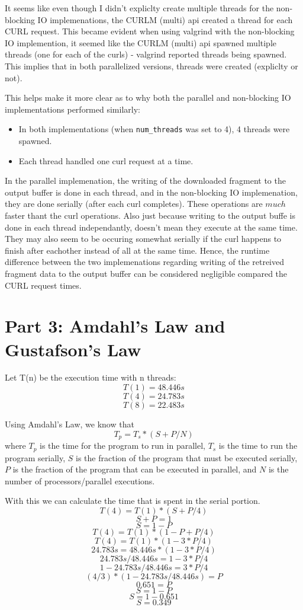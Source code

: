 \documentclass[12pt]{article}
\begin{document}
It seems like even though I didn't expliclty create multiple threads for the non-blocking IO implemenations, the CURLM (multi) api created a thread for each CURL request. This became evident when using valgrind with the non-blocking IO implemention, it seemed like the CURLM (multi) api spawned multiple threads (one for each of the curls) - valgrind reported threads being spawned. This implies that in both parallelized versions, threads were created (expliclty or not).

This helps make it more clear as to why both the parallel and non-blocking IO implementations performed similarly:
\begin{itemize}
\item In both implementations (when {\tt num\_threads} was set to 4), 4 threads were spawned.
\item Each thread handled one curl request at a time.
\end{itemize}

In the parallel implemenation, the writing of the downloaded fragment to the output buffer is done in each thread, and in the non-blocking IO implemenation, they are done serially (after each curl completes). These operations are $much$ faster thant the curl operations. Also just because writing to the output buffe is done in each thread independantly, doesn't mean they execute at the same time. They may also seem to be occuring somewhat serially if the curl happens to finish after eachother instead of all at the same time. Hence, the runtime difference between the two implemenations regarding writing of the retreived fragment data to the output buffer can be considered negligible compared the CURL request times.

\section*{Part 3: Amdahl's Law and Gustafson's Law}

Let T(n) be the execution time with n threads:
\[ T(1) = 48.446s \]
\[ T(4) = 24.783s \]
\[ T(8) = 22.483s \]

Using Amdahl's Law, we know that
\[ T_p = T_s * (S + P/N) \]
where $T_p$ is the time for the program to run in parallel, $T_s$ is the time to run the program serially, $S$ is the fraction of the program that must be executed serially, $P$ is the fraction of the program that can be executed in parallel, and $N$ is the number of processors/parallel executions.

With this we can calculate the time that is spent in the serial portion.
\[ T(4) = T(1) * (S + P/4) \]
\[ S + P = 1 \]
\[ S = 1 - P \]
\[ T(4)	= T(1) * (1 - P + P/4) \]
\[ T(4) = T(1) * (1 - 3 * P/4) \]
\[ 24.783s = 48.446s * (1 - 3 * P/4) \]
\[ 24.783s/48.446s = 1 - 3 * P/4 \]
\[ 1 - 24.783s/48.446s = 3 * P/4 \]
\[ (4/3) * (1 - 24.783s/48.446s) = P \]
\[ 0.651 = P \]
\[ S = 1 - P \]
\[ S = 1 - 0.651 \]
\[ S = 0.349 \]
\end{document}
